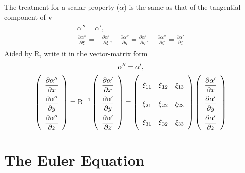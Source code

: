 \documentclass[a4paper,12pt,dvips]{article}
\begin{document}
The treatment for a scalar property ($\alpha$) is the same as that of the
tangential component of $\mathbf{v}$
\begin{align*}
\begin{gathered}
  \alpha'' = \alpha', \\
  \frac{\partial \alpha''}{\partial\xi} =
  -\frac{\partial \alpha'}{\partial\xi}, \quad
  \frac{\partial \alpha''}{\partial\eta} =
  \frac{\partial \alpha'}{\partial\eta}, \quad
  \frac{\partial \alpha''}{\partial\zeta} =
  \frac{\partial \alpha'}{\partial\zeta}
\end{gathered}
\end{align*}
Aided by $\mathrm{R}$, write it in the vector-matrix form
\begin{align}
\begin{gathered}
  \alpha'' = \alpha', \\
  \renewcommand{\arraystretch}{2.2}
  \left(\begin{array}{c}
    \dfrac{\partial\alpha''}{\partial x} \\
    \dfrac{\partial\alpha''}{\partial y} \\
    \dfrac{\partial\alpha''}{\partial z} \\
  \end{array}\right)
  = \mathrm{R}^{-1}
  \left(\begin{array}{c}
    \dfrac{\partial\alpha'}{\partial x} \\
    \dfrac{\partial\alpha'}{\partial y} \\
    \dfrac{\partial\alpha'}{\partial z} \\
  \end{array}\right)
  = \left(\begin{array}{ccc}
    \xi_{11} & \xi_{12} & \xi_{13} \\
    \xi_{21} & \xi_{22} & \xi_{23} \\
    \xi_{31} & \xi_{32} & \xi_{33}
  \end{array}\right)
  \left(\begin{array}{c}
    \dfrac{\partial\alpha'}{\partial x} \\
    \dfrac{\partial\alpha'}{\partial y} \\
    \dfrac{\partial\alpha'}{\partial z} \\
  \end{array}\right)
\end{gathered}
\label{e:treat:sca}
\end{align}

\section{The Euler Equation}
\end{document}
